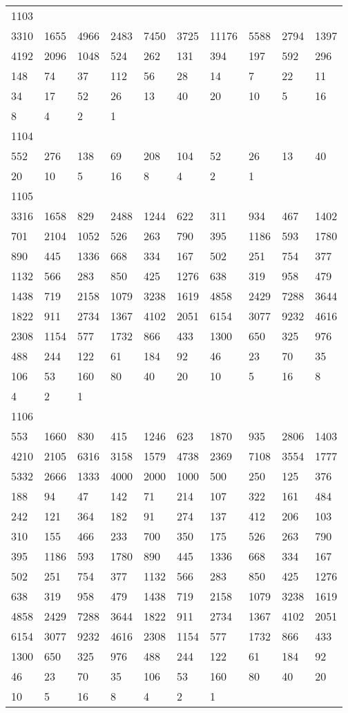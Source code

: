 \begin{longtable}{*{10}{l}}
1103&&&&&&&&&\\
3310& 1655& 4966& 2483& 7450& 3725& 11176& 5588& 2794& 1397\\
4192& 2096& 1048& 524& 262& 131& 394& 197& 592& 296\\
148& 74& 37& 112& 56& 28& 14& 7& 22& 11\\
34& 17& 52& 26& 13& 40& 20& 10& 5& 16\\
8& 4& 2& 1& \\

1104&&&&&&&&&\\
552& 276& 138& 69& 208& 104& 52& 26& 13& 40\\
20& 10& 5& 16& 8& 4& 2& 1& \\

1105&&&&&&&&&\\
3316& 1658& 829& 2488& 1244& 622& 311& 934& 467& 1402\\
701& 2104& 1052& 526& 263& 790& 395& 1186& 593& 1780\\
890& 445& 1336& 668& 334& 167& 502& 251& 754& 377\\
1132& 566& 283& 850& 425& 1276& 638& 319& 958& 479\\
1438& 719& 2158& 1079& 3238& 1619& 4858& 2429& 7288& 3644\\
1822& 911& 2734& 1367& 4102& 2051& 6154& 3077& 9232& 4616\\
2308& 1154& 577& 1732& 866& 433& 1300& 650& 325& 976\\
488& 244& 122& 61& 184& 92& 46& 23& 70& 35\\
106& 53& 160& 80& 40& 20& 10& 5& 16& 8\\
4& 2& 1& \\

1106&&&&&&&&&\\
553& 1660& 830& 415& 1246& 623& 1870& 935& 2806& 1403\\
4210& 2105& 6316& 3158& 1579& 4738& 2369& 7108& 3554& 1777\\
5332& 2666& 1333& 4000& 2000& 1000& 500& 250& 125& 376\\
188& 94& 47& 142& 71& 214& 107& 322& 161& 484\\
242& 121& 364& 182& 91& 274& 137& 412& 206& 103\\
310& 155& 466& 233& 700& 350& 175& 526& 263& 790\\
395& 1186& 593& 1780& 890& 445& 1336& 668& 334& 167\\
502& 251& 754& 377& 1132& 566& 283& 850& 425& 1276\\
638& 319& 958& 479& 1438& 719& 2158& 1079& 3238& 1619\\
4858& 2429& 7288& 3644& 1822& 911& 2734& 1367& 4102& 2051\\
6154& 3077& 9232& 4616& 2308& 1154& 577& 1732& 866& 433\\
1300& 650& 325& 976& 488& 244& 122& 61& 184& 92\\
46& 23& 70& 35& 106& 53& 160& 80& 40& 20\\
10& 5& 16& 8& 4& 2& 1& \\


\end{longtable}
